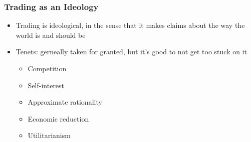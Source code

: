 \subsubsection{Trading as an Ideology}
\begin{itemize}
    \item Trading is ideological, in the sense that it makes claims about the way the world is and should be
    \item Tenets: gerneally taken for granted, but it's good to not get too stuck on it
        \begin{itemize}
            \item Competition
            \item Self-interest
            \item Approximate rationality
            \item Economic reduction
            \item Utilitarianism
        \end{itemize}
\end{itemize}
